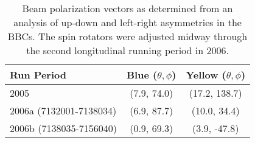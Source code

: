 


\begin{table}
  \begin{center}
    \begin{tabular}{l|c|c}
      Run Period & Blue ($\theta, \phi$) & Yellow ($\theta, \phi$) \\
      \hline
      2005 & (7.9, 74.0) & (17.2, 138.7) \\
      2006a (7132001-7138034) & (6.9, 87.7) & (10.0, 34.4) \\ 
      2006b (7138035-7156040) & (0.9, 69.3) & (3.9, -47.8)
    \end{tabular}
  \end{center}
  \caption{Beam polarization vectors as determined from an analysis of up-down and left-right asymmetries in the BBCs.  The spin rotators were adjusted midway through the second longitudinal running period in 2006.}
  \label{tab:pol-vectors}
\end{table}





